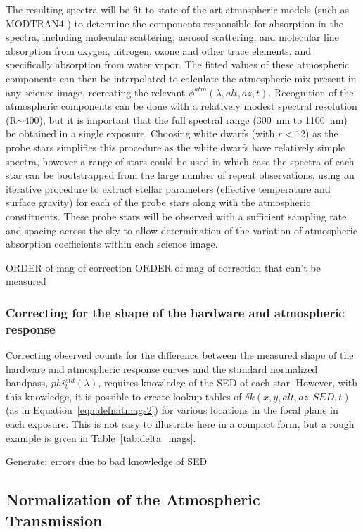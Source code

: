 \documentclass[12pt,preprint]{aastex}
\begin{document}
 The resulting spectra will be fit to state-of-the-art
atmospheric models (such as MODTRAN4 \citep{modtran4a, modtran4b}) to
determine the components responsible for absorption in the spectra,
including molecular scattering, aerosol scattering, and molecular line
absorption from oxygen, nitrogen, ozone and other trace elements, and
specifically absorption from water vapor. The fitted values of these
atmospheric components can then be interpolated to calculate the
atmospheric mix present in any science image, recreating the relevant
$\phi^{atm}(\lambda,alt,az,t)$. Recognition of the atmospheric
components can be done with a relatively modest spectral resolution
(R$\sim400$), but it is important that the full spectral range (300~nm
to 1100~nm) be obtained in a single exposure. Choosing white dwarfs
(with $r<12$) as the probe stars simplifies this procedure as the
white dwarfs have relatively simple spectra, however a range of stars
could be used in which case the spectra of each star can be
bootstrapped from the large number of repeat observations, using an
iterative procedure to extract stellar parameters (effective
temperature and surface gravity) for each of the probe stars along
with the atmospheric constituents. These probe stars will be observed
with a sufficient sampling rate and spacing across the sky to allow
determination of the variation of atmospheric absorption coefficients
within each science image.

ORDER of mag of correction
ORDER of mag of correction that can't be measured


\subsubsection{Correcting for the shape of the hardware and atmospheric response}
\label{sec:apply_deltak}

Correcting observed counts for the difference between the measured
shape of the hardware and atmospheric response curves and the standard
normalized bandpass, $phi_b^{std}(\lambda)$, requires knowledge of the
SED of each star. However, with this knowledge, it is possible to create
lookup tables of $\delta k(x,y,alt,az,SED,t)$ (as in Equation~\ref{eqn:defnatmags2})
for various locations in the focal plane in each exposure. This is
not easy to illustrate here in a compact form, but a rough example
is given in Table~\ref{tab:delta_mags}.

Generate: errors due to bad knowledge of SED


\subsection{Normalization of the Atmospheric Transmission}
\label{sec:selfcalib}
\end{document}
